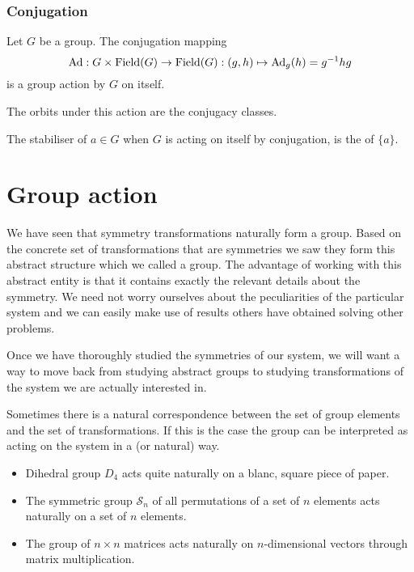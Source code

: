 \subsubsection{Conjugation}
Let $G$ be a group. The conjugation mapping
\[ \operatorname{Ad}: G\times \operatorname{Field}(G) \to \operatorname{Field}(G): (g,h) \mapsto \operatorname{Ad}_g(h) = g^{-1}hg \]
is a group action by $G$ on itself.

The orbits under this action are the conjugacy classes.

The stabiliser of $a\in G$ when $G$ is acting on itself by conjugation, is the  of $\{a\}$.





\section{Group action}
We have seen that symmetry transformations naturally form a group. Based on the concrete set of transformations that are symmetries we saw they form this abstract structure which we called a group. The advantage of working with this abstract entity is that it contains exactly the relevant details about the symmetry. We need not worry ourselves about the peculiarities of the particular system and we can easily make use of results others have obtained solving other problems.

Once we have thoroughly studied the symmetries of our system, we will want a way to move back from studying abstract groups to studying transformations of the system we are actually interested in.

Sometimes there is a natural correspondence between the set of group elements and the set of transformations. If this is the case the group can be interpreted as acting on the system in a  (or natural) way.

\begin{example}
\begin{itemize}
\item Dihedral group $D_4$ acts quite naturally on a blanc, square piece of paper.
\item The symmetric group $\mathcal{S}_n$ of all permutations of a set of $n$ elements acts naturally on a set of $n$ elements.
\item The group of $n\times n$ matrices acts naturally on $n$-dimensional vectors through matrix multiplication.
\end{itemize}
\end{example}

